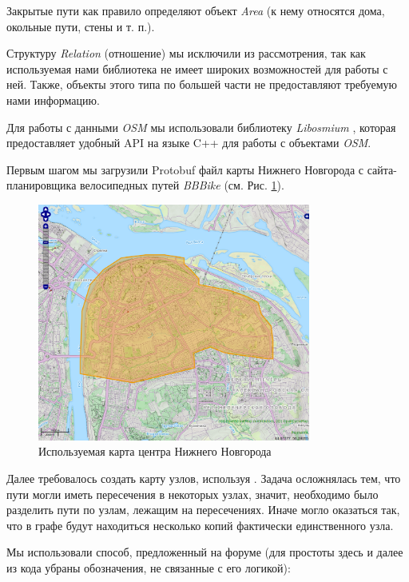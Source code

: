 \documentclass[11pt]{article}
\begin{document}
    	Закрытые пути как правило определяют объект \textit{Area} (к нему относятся дома, окольные пути, стены и т. п.).
    	
    	Структуру \textit{Relation} (отношение) мы исключили из рассмотрения, так как используемая нами библиотека не имеет широких возможностей для работы с ней.
    	Также, объекты этого типа по большей части не предоставляют требуемую нами информацию.
    
	Для работы с данными \textit{OSM} мы использовали библиотеку \textit{Libosmium} \cite{libosm}, которая предоставляет удобный API на языке C++ для работы с объектами \textit{OSM}.
	
	Первым шагом мы загрузили Protobuf файл карты Нижнего Новгорода с сайта-планировщика велосипедных путей \textit{BBBike} \cite{bbbike} (см. Рис. \ref{fig:bbbike}).

	\begin{figure}[ht]
	\centering	
	\includegraphics[width=0.8\textwidth]{pics/bbbike.png}
	\caption{Используемая карта центра Нижнего Новгорода}
	\label{fig:bbbike}
	\end{figure}
	
	Далее требовалось создать карту узлов, используя \cite{libosm}.
	Задача осложнялась тем, что пути могли иметь пересечения в некоторых узлах, значит, необходимо было разделить пути по узлам, лежащим на пересечениях.
	Иначе могло оказаться так, что в графе будут находиться несколько копий фактически единственного узла.
	
	Мы использовали способ, предложенный на форуме \cite{forum} (для простоты здесь и далее из кода убраны обозначения, не связанные с его логикой):
	
\end{document}
